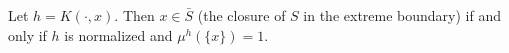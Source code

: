Let $h = K(\cdot, x)$. Then $x \in \bar{S}$ (the closure of $S$ in the extreme boundary) if and only if $h$ is normalized and $\mu^h(\{x\}) = 1$.
